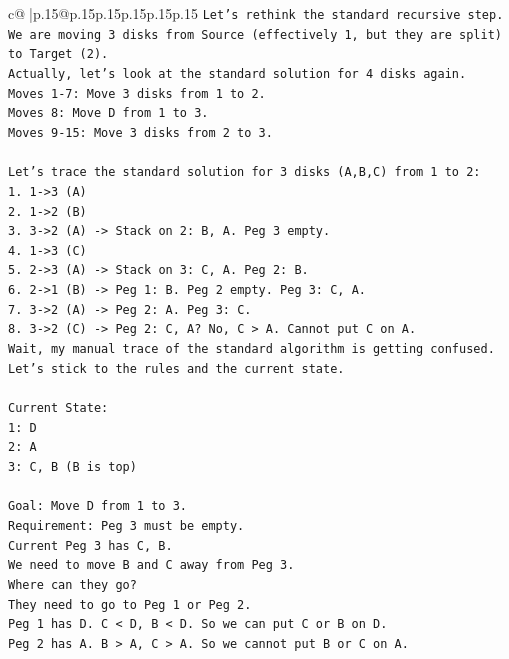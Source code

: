 \documentclass{article}
\begin{document}
{\begin{supertabular}{c@{$\;$}|p{.15\linewidth}@{}p{.15\linewidth}p{.15\linewidth}p{.15\linewidth}p{.15\linewidth}p{.15\linewidth}}
{{{\texttt{Let's rethink the standard recursive step.} \\
\texttt{We are moving 3 disks from Source (effectively 1, but they are split) to Target (2).} \\
\texttt{Actually, let's look at the standard solution for 4 disks again.} \\
\texttt{Moves 1{-}7: Move 3 disks from 1 to 2.} \\
\texttt{Moves 8: Move D from 1 to 3.} \\
\texttt{Moves 9{-}15: Move 3 disks from 2 to 3.} \\
\\ 
\texttt{Let's trace the standard solution for 3 disks (A,B,C) from 1 to 2:} \\
\texttt{1. 1{-}>3 (A)} \\
\texttt{2. 1{-}>2 (B)} \\
\texttt{3. 3{-}>2 (A) {-}> Stack on 2: B, A. Peg 3 empty.} \\
\texttt{4. 1{-}>3 (C)} \\
\texttt{5. 2{-}>3 (A) {-}> Stack on 3: C, A. Peg 2: B.} \\
\texttt{6. 2{-}>1 (B) {-}> Peg 1: B. Peg 2 empty. Peg 3: C, A.} \\
\texttt{7. 3{-}>2 (A) {-}> Peg 2: A. Peg 3: C.} \\
\texttt{8. 3{-}>2 (C) {-}> Peg 2: C, A? No, C > A. Cannot put C on A.} \\
\texttt{Wait, my manual trace of the standard algorithm is getting confused. Let's stick to the rules and the current state.} \\
\\ 
\texttt{Current State:} \\
\texttt{1: D} \\
\texttt{2: A} \\
\texttt{3: C, B (B is top)} \\
\\ 
\texttt{Goal: Move D from 1 to 3.} \\
\texttt{Requirement: Peg 3 must be empty.} \\
\texttt{Current Peg 3 has C, B.} \\
\texttt{We need to move B and C away from Peg 3.} \\
\texttt{Where can they go?} \\
\texttt{They need to go to Peg 1 or Peg 2.} \\
\texttt{Peg 1 has D. C < D, B < D. So we can put C or B on D.} \\
\texttt{Peg 2 has A. B > A, C > A. So we cannot put B or C on A.} \\
}}}
\end{supertabular}}
\end{document}
